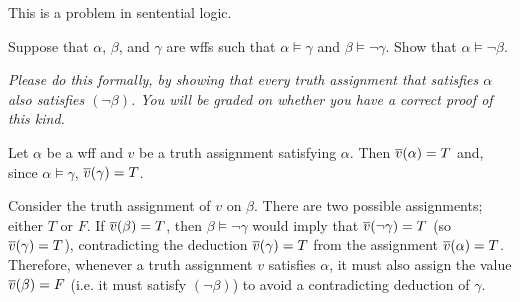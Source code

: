 \begin{problem}
  This is a problem in sentential logic.

  \step
  Suppose that $\alpha$, $\beta$, and $\gamma$ are wffs
  such that $\alpha \models \gamma$ and $\beta \models \lnot \gamma$.
  Show that $\alpha \models \lnot \beta$.

  \step
  \emph{
    Please do this formally, by showing that every truth assignment that
    satisfies $\alpha$ also satisfies $(\lnot \beta)$.
    You will be graded on whether you have a
    correct proof of this kind.
  }
\end{problem}
\begin{Answer}
  Let $\alpha$ be a wff and $v$ be a truth assignment satisfying $\alpha$.
  Then $\overline{v}(\alpha) = T$ and, since $\alpha \models \gamma$,
  $\overline{v}(\gamma) = T$.

  \step
  Consider the truth assignment of $v$ on $\beta$.
  There are two possible assignments; either $T$ or $F$.
  If $\overline{v}(\beta) = T$, then $\beta \models \lnot \gamma$ would imply that
  $\overline{v}(\lnot \gamma) = T$ (so $\overline{v}(\gamma) = T$),
  contradicting the deduction $\overline{v}(\gamma) = T$ from the assignment $\overline{v}(\alpha) = T$.
  Therefore, whenever a truth assignment $v$ satisfies $\alpha$,
  it must also assign the value $\overline{v}(\beta) = F$ (i.e. it must satisfy $(\lnot \beta)$)
  to avoid a contradicting deduction of $\gamma$.
\end{Answer}

